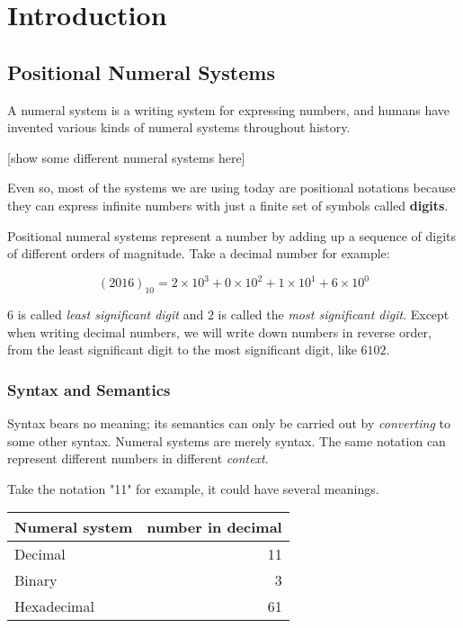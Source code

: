 \documentclass[../thesis.tex]{subfiles}
\begin{document}
\chapter{Introduction}\label{introduction}

\section{Positional Numeral Systems}

A numeral system is a writing system for expressing numbers, and humans have
invented various kinds of numeral systems throughout history.

[show some different numeral systems here]

Even so, most of the systems we are using today are positional notations\cite{knuth1998art}
because they can express infinite numbers with just a finite set of symbols called \textbf{digits}.

Positional numeral systems represent a number by adding up a sequence of digits
of different orders of magnitude. Take a decimal number for example:

$$ (2016)_{10} = 2\times10^3 + 0\times10^2 + 1\times10^1 + 6\times10^0 $$

$ 6 $ is called \textit{least significant digit} and $ 2 $ is called the
\textit{most significant digit}. Except when writing decimal numbers,
we will write down numbers in reverse order, from the least significant digit to
the most significant digit, like $ 6102 $.

\subsection{Syntax and Semantics}

Syntax bears no meaning;
its semantics can only be carried out by \textit{converting} to some other syntax.
Numeral systems are merely syntax.
The same notation can represent different numbers in different \textit{context}.

Take the notation "11" for example, it could have several meanings.

\begin{center}
    \begin{tabular}{ | l | r | }
    Numeral system      & number in decimal  \\
    \hline
    Decimal             & 11    \\
    Binary              & 3     \\
    Hexadecimal         & 61    \\
    \end{tabular}
\end{center}
\end{document}
